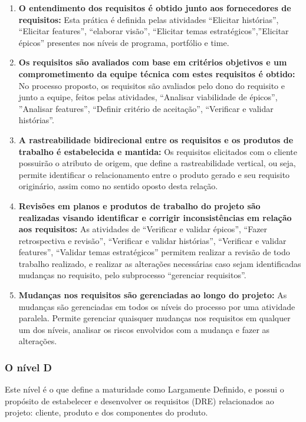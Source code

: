 \begin{enumerate}
    \item \textbf{O entendimento dos requisitos é obtido junto aos fornecedores de requisitos:} Esta prática é definida pelas atividades “Elicitar histórias”, “Elicitar features”, “elaborar visão”, “Elicitar temas estratégicos”,”Elicitar épicos” presentes nos níveis de programa, portfólio e time.
    \item \textbf{Os requisitos são avaliados com base em critérios objetivos e um comprometimento da equipe técnica com estes requisitos é obtido:} No processo proposto, os requisitos são avaliados pelo dono do requisito e junto a equipe, feitos pelas atividades, “Analisar viabilidade de épicos”, ”Analisar features”, “Definir critério de aceitação”, “Verificar e validar histórias”.
    \item \textbf{A rastreabilidade bidirecional entre os requisitos e os produtos de trabalho é estabelecida e mantida:} Os requisitos elicitados com o cliente possuirão o atributo de origem, que define a rastreabilidade vertical, ou seja, permite identificar o relacionamento entre o produto gerado e seu requisito originário, assim como no sentido oposto desta relação.
    \item \textbf{Revisões em planos e produtos de trabalho do projeto são realizadas visando identificar e corrigir inconsistências em relação aos requisitos:} As atividades de “Verificar e validar épicos”, “Fazer retrospectiva e revisão”, “Verificar e validar histórias”, “Verificar e validar features”, “Validar temas estratégicos” permitem realizar a revisão de todo trabalho realizado, e realizar as alterações necessárias caso sejam identificadas mudanças no requisito, pelo subprocesso “gerenciar requisitos”.
    \item \textbf{Mudanças nos requisitos são gerenciadas ao longo do projeto:} As mudanças são gerenciadas em todos os níveis do processo por uma atividade paralela. Permite gerenciar quaisquer mudanças nos requisitos em qualquer um dos níveis, analisar os riscos envolvidos com a mudança e fazer as alterações.
\end{enumerate}

\subsubsection{O nível D}

Este nível é o que define a maturidade como Largamente Definido, e possui o propósito de estabelecer e desenvolver os requisitos (DRE) relacionados ao projeto: cliente, produto e dos componentes do produto.

